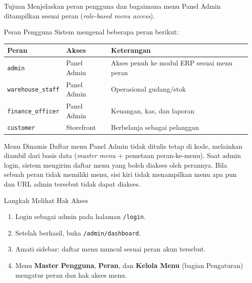 
\begin{flowsection}{Tujuan}
Menjelaskan peran pengguna dan bagaimana menu Panel Admin ditampilkan sesuai
peran (\emph{role-based menu access}).
\end{flowsection}

\begin{flowsection}{Peran Pengguna}
Sistem mengenal beberapa peran berikut:
\begin{center}
\renewcommand{\arraystretch}{1.4}
\begin{tabular}{|l|l|l|}
\hline
\textbf{Peran} & \textbf{Akses} & \textbf{Keterangan} \\ \hline
\texttt{admin} & Panel Admin & Akses penuh ke modul ERP sesuai menu peran \\ \hline
\texttt{warehouse\_staff} & Panel Admin & Operasional gudang/stok \\ \hline
\texttt{finance\_officer} & Panel Admin & Keuangan, kas, dan laporan \\ \hline
\texttt{customer} & Storefront & Berbelanja sebagai pelanggan \\ \hline
\end{tabular}
\end{center}
\end{flowsection}

\begin{flowsection}{Menu Dinamis}
Daftar menu Panel Admin tidak ditulis tetap di kode, melainkan diambil dari
basis data (\emph{master menu} + pemetaan peran-ke-menu). Saat admin login,
sistem mengirim daftar menu yang boleh diakses oleh perannya. Bila sebuah peran
tidak memiliki menu, sisi kiri tidak menampilkan menu apa pun dan URL admin
tersebut tidak dapat diakses.
\end{flowsection}


\begin{flowsection}{Langkah Melihat Hak Akses}
\begin{enumerate}
  \item Login sebagai admin pada halaman \texttt{/login}.
  \item Setelah berhasil, buka \texttt{/admin/dashboard}.
  \item Amati sidebar: daftar menu muncul sesuai peran akun tersebut.
  \item Menu \textbf{Master Pengguna}, \textbf{Peran}, dan \textbf{Kelola Menu}
        (bagian Pengaturan) mengatur peran dan hak akses menu.
\end{enumerate}
\end{flowsection}

